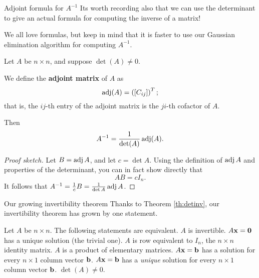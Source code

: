 \begin{frame}{Adjoint formula for $A^{-1}$}
Its worth recording also that we can use the determinant to give an actual formula for computing the inverse of a matrix! 

We all love formulas, but keep in mind that it is faster to use our Gaussian elimination algorithm for computing $A^{-1}$.
\begin{theorem}
Let $A$ be $n\times n$, and suppose $\det(A)\ne 0$. 

We define the {\bf adjoint matrix} of $A$ as 
\[
\operatorname{adj}(A)=\left([C_{ij}]\right)^T;
\]
that is, the $ij$-th entry of the adjoint matrix is the $ji$-th cofactor of $A$. 

Then 
\[
A^{-1}=\frac{1}{\det(A)}\operatorname{adj}(A).
\]

\end{theorem}
\pause
\begin{proof}[Proof sketch] Let $B=\operatorname{adj} A$, and let $c=\det A$. Using the definition of $\operatorname{adj} A$ and properties of the determinant, you can in fact show directly that 
\[
AB=c I_n.
\]
It follows that $A^{-1}=\frac{1}{c}B=\frac{1}{\det A}\operatorname{adj} A$.
\end{proof}
\end{frame}
\begin{frame}{Our growing invertibility theorem}
Thanks to Theorem \ref{th:detinv}, our invertibility theorem has grown by one statement. 
\begin{theorem}
Let $A$ be $n\times n$. The following statements are equivalent. 
\bb[(a)]
\ii $A$ is invertible.
\ii $A{\mathbf x}={\mathbf 0}$ has a unique solution (the trivial one). 
\ii $A$ is row equivalent to $I_n$, the $n\times n$ identity matrix.
\ii $A$ is a product of elementary matrices. 	
\ii $A{\mathbf x}={\mathbf b}$ has a solution for every $n\times 1$ column vector ${\mathbf b}$. 
\ii $A{\mathbf x}={\mathbf b}$ has a {\em unique} solution for every $n\times 1$ column vector ${\mathbf b}$. 
\ii $\det(A)\ne 0$.
\ee
\end{theorem}

\end{frame}